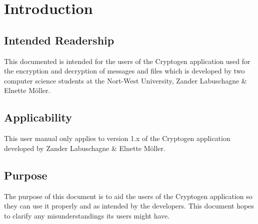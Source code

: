 \documentclass[11pt]{article}
\begin{document}
	

    \renewcommand{\cftsecleader}{\cftdotfill{\cftdotsep}} %
    \tableofcontents
    \thispagestyle{empty}
    \clearpage


    \setcounter{page}{1}

	\section{Introduction}
	\subsection{Intended Readership}
	This documented is intended for the users of the Cryptogen application used for the encryption and decryption of messages and files which is developed by two computer science students at the Nort-West University, Zander Labuschagne \& Elnette M\"{o}ller.

	\subsection{Applicability}
	This user manual only applies to version 1.x of the Cryptogen application developed by Zander Labuschagne \& Elnette M\"{o}ller.

	\subsection{Purpose}
	The purpose of this document is to aid the users of the Cryptogen application so they can use it properly and as intended by the developers. This document hopes to clarify any misunderstandings its users might have.
\end{document}
